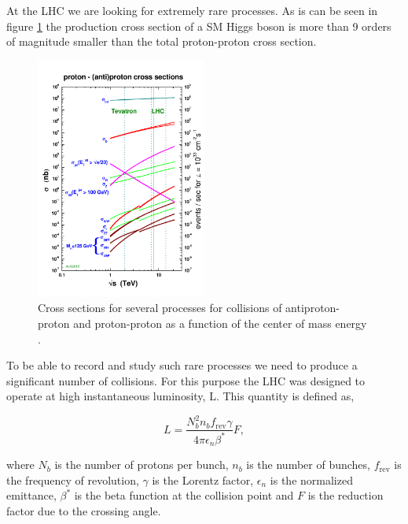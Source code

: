 

At the \gls{LHC} we are looking for extremely rare processes. As is can be seen in figure \ref{FIGURE:ExperimentalApparatus_LHCCrossSections} the production cross section of a \gls{SM} Higgs boson is more than 9 orders of magnitude smaller than the total proton-proton cross section. 

\begin{figure}[!htb]
  \centering
  \includegraphics[width=0.50\textwidth]{Chapter02/LHC/Images/crosssections2012_v5}
  \caption{Cross sections for several processes for collisions of antiproton-proton and proton-proton as a function of the center of mass energy \cite{ARTICLE:TheCMSExperiment}.}
  \label{FIGURE:ExperimentalApparatus_LHCCrossSections}
\end{figure}

To be able to record and study such rare processes we need to produce a significant number of collisions. For this purpose the \gls{LHC} was designed to operate at high instantaneous luminosity, L. This quantity is defined as,

\begin{equation}
L=\frac{N_{b}^{2}n_{b}f_{\text{rev}}\gamma}{4\pi\epsilon_{n}\beta^{*}}F,
\end{equation}

where $N_{b}$ is the number of protons per bunch, $n_{b}$ is the number of bunches, $f_{\text{rev}}$ is the frequency of revolution, $\gamma$ is the Lorentz factor, $\epsilon_{n}$ is the normalized emittance, $\beta^{*}$ is the beta function at the collision point and $F$ is the reduction factor due to the crossing angle.

